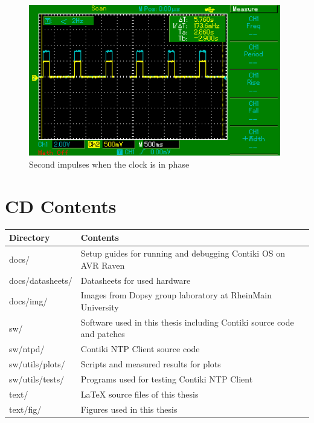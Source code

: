 \begin{figure}
  \centering
  \includegraphics[width=11cm,keepaspectratio]{fig/osc-in-phase.png}
  \caption{Second impulses when the clock is in phase}
  \label{fig:app-osc-in-phase}
  \bigskip
\end{figure}


\chapter{CD Contents}\label{app:cd-contents}
\begin{tabular}{|l|l|}
	\hline
	Directory & Contents \\ \hline
	docs/ & Setup guides for running and debugging Contiki OS on AVR Raven\\
	docs/datasheets/ & Datasheets for used hardware\\
	docs/img/ & Images from Dopsy group laboratory at RheinMain University\\
	sw/ & Software used in this thesis including Contiki source code and patches\\
	sw/ntpd/ & Contiki NTP Client source code\\
	sw/utils/plots/ & Scripts and measured results for plots\\
	sw/utils/tests/ & Programs used for testing Contiki NTP Client\\
	text/ & LaTeX source files of this thesis\\
	text/fig/ & Figures used in this thesis\\
	\hline
\end{tabular}

